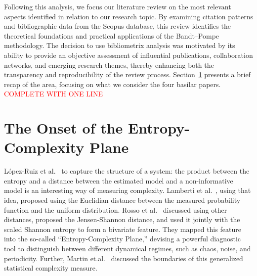 Following this analysis, we focus our literature review on the most relevant aspects identified in relation to our research topic. By examining citation patterns and bibliographic data from the Scopus database, this review identifies the theoretical foundations and practical applications of the Bandt–Pompe methodology. The decision to use bibliometrix analysis was motivated by its ability to provide an objective assessment of influential publications, collaboration networks, and emerging research themes, thereby enhancing both the transparency and reproducibility of the review process.
Section~\ref{Sec:Onset} presents a brief recap of the area, focusing on what we consider the four basilar papers.
\textcolor{red}{COMPLETE WITH ONE LINE}

\section{The Onset of the Entropy-Complexity Plane}\label{Sec:Onset}




López-Ruiz et al.~\cite{lopez1995statistical} to capture the structure of a system:
the product between the entropy and a distance between the estimated model and a non-informative model is an interesting way of measuring complexity.
Lamberti et al.~\cite{lamberti2004intensive}, using that idea, proposed using the Euclidian distance between the measured probability function and the uniform distribution.
Rosso et al.~\cite{EEGAnalysisUsingWaveletBasedInformationTools} discussed using other distances, proposed the Jensen-Shannon distance, and used it jointly with the scaled Shannon entropy to form a bivariate feature.
They mapped this feature into the so-called ``Entropy-Complexity Plane,'' devising  a powerful diagnostic tool to distinguish between different dynamical regimes, such as chaos, noise, and periodicity.
Further, Martin et.al.~\cite{Martin2006} discussed the boundaries of this generalized statistical complexity measure. 


